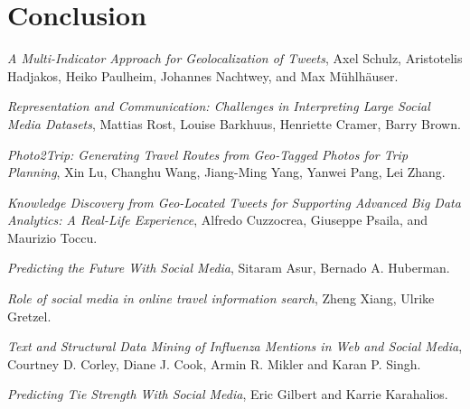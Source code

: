 \documentclass[conference]{doc}
\begin{document}

	\section{Conclusion}

	\ifCLASSOPTIONcaptionsoff
  		\newpage
	\fi




%
%
%
\begin{thebibliography}{1} %
		\emph{A Multi-Indicator Approach for Geolocalization of Tweets}, Axel Schulz,
		Aristotelis Hadjakos, Heiko Paulheim, Johannes Nachtwey, and Max Mühlhäuser.
		
		\emph{Representation and Communication: Challenges in Interpreting Large
		Social Media Datasets}, Mattias Rost, Louise Barkhuus, Henriette Cramer, Barry
		Brown.
		
		\emph{Photo2Trip: Generating Travel Routes from Geo-Tagged Photos for Trip
		Planning}, Xin Lu, Changhu Wang, Jiang-Ming Yang, Yanwei Pang, Lei Zhang.
		
		\emph{Knowledge Discovery from Geo-Located Tweets for Supporting Advanced Big
		Data Analytics: A Real-Life Experience}, Alfredo Cuzzocrea, Giuseppe Psaila,
		and Maurizio Toccu.
		
		\emph{Predicting the Future With Social Media}, Sitaram Asur, Bernado A.
		Huberman.
		
		\emph{Role of social media in online travel information search}, Zheng Xiang,
		Ulrike Gretzel.
		
		\emph{Text and Structural Data Mining of Influenza Mentions in Web and Social
		Media}, Courtney D. Corley, Diane J. Cook, Armin R. Mikler and Karan P. Singh.
		
		\emph{Predicting Tie Strength With Social Media}, Eric Gilbert and Karrie
		Karahalios.		
\end{thebibliography}
\end{document}
